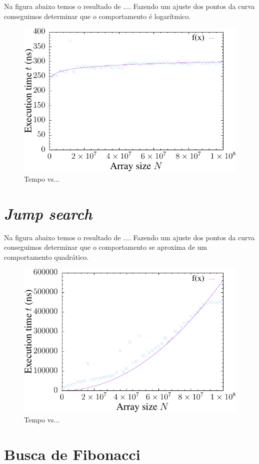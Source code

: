 Na figura abaixo temos o resultado de .... Fazendo um ajuste dos pontos da curva conseguimos determinar que o comportamento é logarítmico.


\begin{figure}[H]
  \centering
  \includegraphics[scale=1.2]{../plots/tsearch_rec_time.pdf}
  \caption{Tempo vs...}
\end{figure} \label{fig:tseach_rec_time}

\section{{\it Jump search}}

Na figura abaixo temos o resultado de .... Fazendo um ajuste dos pontos da curva conseguimos determinar que o comportamento se aproxima de um comportamento quadrático.


\begin{figure}[H]
  \centering
  \includegraphics[scale=1.2]{../plots/jumpsearch_time.pdf}
  \caption{Tempo vs...}
\end{figure} \label{fig:jumpsearch_time}

\section{Busca de Fibonacci}

